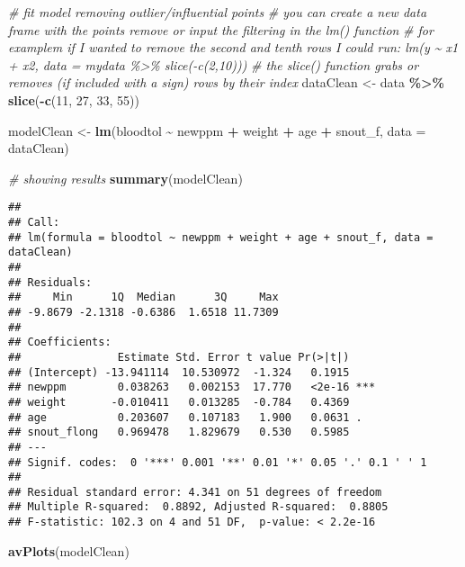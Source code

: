 \documentclass[
]{article}
\newenvironment{Shaded}{\begin{snugshade}}{\end{snugshade}}
\newcommand{\AttributeTok}[1]{\textcolor[rgb]{0.13,0.29,0.53}{#1}}
\newcommand{\CommentTok}[1]{\textcolor[rgb]{0.56,0.35,0.01}{\textit{#1}}}
\newcommand{\DecValTok}[1]{\textcolor[rgb]{0.00,0.00,0.81}{#1}}
\newcommand{\FunctionTok}[1]{\textcolor[rgb]{0.13,0.29,0.53}{\textbf{#1}}}
\newcommand{\NormalTok}[1]{#1}
\newcommand{\OtherTok}[1]{\textcolor[rgb]{0.56,0.35,0.01}{#1}}
\newcommand{\SpecialCharTok}[1]{\textcolor[rgb]{0.81,0.36,0.00}{\textbf{#1}}}
\begin{document}
\begin{Shaded}
\begin{Highlighting}[]
\CommentTok{\# fit model removing outlier/influential points}
\CommentTok{\# you can create a new data frame with the points remove or input the filtering in the lm() function}
\CommentTok{\# for examplem if I wanted to remove the second and tenth rows I could run: lm(y \textasciitilde{} x1 + x2, data = mydata \%\textgreater{}\% slice({-}c(2,10)))}
\CommentTok{\# the slice() function grabs or removes (if included with a \textasciigrave{}{-}\textasciigrave{} sign) rows by their index}
\NormalTok{dataClean }\OtherTok{\textless{}{-}}\NormalTok{ data }\SpecialCharTok{\%\textgreater{}\%}
  \FunctionTok{slice}\NormalTok{(}\SpecialCharTok{{-}}\FunctionTok{c}\NormalTok{(}\DecValTok{11}\NormalTok{, }\DecValTok{27}\NormalTok{, }\DecValTok{33}\NormalTok{, }\DecValTok{55}\NormalTok{))}

\NormalTok{modelClean }\OtherTok{\textless{}{-}} \FunctionTok{lm}\NormalTok{(bloodtol }\SpecialCharTok{\textasciitilde{}}\NormalTok{ newppm }\SpecialCharTok{+}\NormalTok{ weight }\SpecialCharTok{+}\NormalTok{ age }\SpecialCharTok{+}\NormalTok{ snout\_f, }\AttributeTok{data =}\NormalTok{ dataClean)}

\CommentTok{\# showing results}
\FunctionTok{summary}\NormalTok{(modelClean)}
\end{Highlighting}
\end{Shaded}

\begin{verbatim}
## 
## Call:
## lm(formula = bloodtol ~ newppm + weight + age + snout_f, data = dataClean)
## 
## Residuals:
##     Min      1Q  Median      3Q     Max 
## -9.8679 -2.1318 -0.6386  1.6518 11.7309 
## 
## Coefficients:
##               Estimate Std. Error t value Pr(>|t|)    
## (Intercept) -13.941114  10.530972  -1.324   0.1915    
## newppm        0.038263   0.002153  17.770   <2e-16 ***
## weight       -0.010411   0.013285  -0.784   0.4369    
## age           0.203607   0.107183   1.900   0.0631 .  
## snout_flong   0.969478   1.829679   0.530   0.5985    
## ---
## Signif. codes:  0 '***' 0.001 '**' 0.01 '*' 0.05 '.' 0.1 ' ' 1
## 
## Residual standard error: 4.341 on 51 degrees of freedom
## Multiple R-squared:  0.8892, Adjusted R-squared:  0.8805 
## F-statistic: 102.3 on 4 and 51 DF,  p-value: < 2.2e-16
\end{verbatim}

\begin{Shaded}
\begin{Highlighting}[]
\FunctionTok{avPlots}\NormalTok{(modelClean)}
\end{Highlighting}
\end{Shaded}
\end{document}
